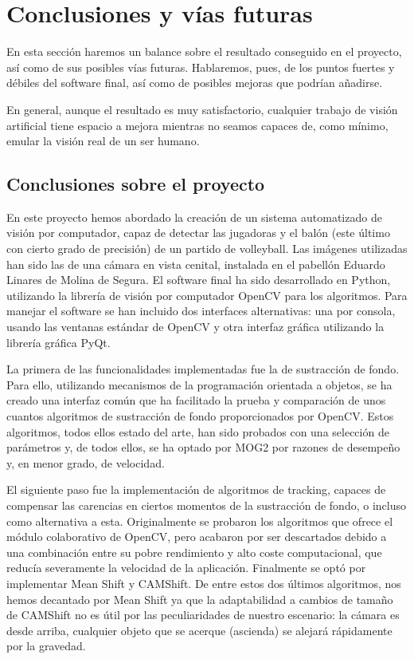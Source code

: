 \section{Conclusiones y vías futuras}
En esta sección haremos un balance sobre el resultado conseguido en el proyecto, así como de sus posibles vías futuras. Hablaremos, pues, de los puntos fuertes y débiles del software final, así como de posibles mejoras que podrían añadirse. 

En general, aunque el resultado es muy satisfactorio, cualquier trabajo de visión artificial tiene espacio a mejora mientras no seamos capaces de, como mínimo, emular la visión real de un ser humano.

\subsection{Conclusiones sobre el proyecto}
En este proyecto hemos abordado la creación de un sistema automatizado de visión por computador, capaz de detectar las jugadoras y el balón (este último con cierto grado de precisión) de un partido de volleyball. Las imágenes utilizadas han sido las de una cámara en vista cenital, instalada en el pabellón Eduardo Linares de Molina de Segura. El software final ha sido desarrollado en Python, utilizando la librería de visión por computador OpenCV para los algoritmos. Para manejar el software se han incluido dos interfaces alternativas: una por consola, usando las ventanas estándar de OpenCV y otra interfaz gráfica utilizando la librería gráfica PyQt.

La primera de las funcionalidades implementadas fue la de sustracción de fondo. Para ello, utilizando mecanismos de la programación orientada a objetos, se ha creado una interfaz común que ha facilitado la prueba y comparación de unos cuantos algoritmos de sustracción de fondo proporcionados por OpenCV. Estos algoritmos, todos ellos estado del arte, han sido probados con una selección de parámetros y, de todos ellos, se ha optado por MOG2 por razones de desempeño y, en menor grado, de velocidad.

El siguiente paso fue la implementación de algoritmos de tracking, capaces de compensar las carencias en ciertos momentos de la sustracción de fondo, o incluso como alternativa a esta. Originalmente se probaron los algoritmos que ofrece el módulo colaborativo de OpenCV, pero acabaron por ser descartados debido a una combinación entre su pobre rendimiento y alto coste computacional, que reducía severamente la velocidad de la aplicación. Finalmente se optó por implementar Mean Shift y CAMShift. De entre estos dos últimos algoritmos, nos hemos decantado por Mean Shift ya que la adaptabilidad a cambios de tamaño de CAMShift no es útil por las peculiaridades de nuestro escenario: la cámara es desde arriba, cualquier objeto que se acerque (ascienda) se alejará rápidamente por la gravedad.

